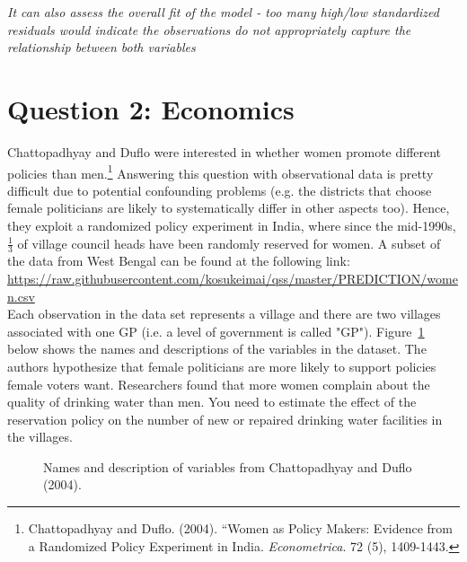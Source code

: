\documentclass[12pt,letterpaper]{article}
\begin{document}
\begin{enumerate}
	\vspace{.5cm}
	\textit{It can also assess the overall fit of the model - too many high/low standardized residuals would indicate the observations do not appropriately capture the relationship between both variables}
	
\end{enumerate}
\newpage

\section*{Question 2: Economics}
Chattopadhyay and Duflo were interested in whether women promote different policies than men.\footnote{Chattopadhyay and Duflo. (2004). ``Women as Policy Makers: Evidence from a Randomized Policy Experiment in India. \textit{Econometrica}. 72 (5), 1409-1443.} Answering this question with observational data is pretty difficult due to potential confounding problems (e.g. the districts that choose female politicians are likely to systematically differ in other aspects too). Hence, they exploit a randomized policy experiment in India, where since the mid-1990s, $\frac{1}{3}$ of village council heads have been randomly reserved for women. A subset of the data from West Bengal can be found at the following link: \url{https://raw.githubusercontent.com/kosukeimai/qss/master/PREDICTION/women.csv}\\

\noindent Each observation in the data set represents a village and there are two villages associated with one GP (i.e. a level of government is called "GP"). Figure~\ref{fig:women_desc} below shows the names and descriptions of the variables in the dataset. The authors hypothesize that female politicians are more likely to support policies female voters want. Researchers found that more women complain about the quality of drinking water than men. You need to estimate the effect of the reservation policy on the number of new or repaired drinking water facilities in the villages.
\vspace{.5cm}
\begin{figure}[h!]
	\caption{\footnotesize{Names and description of variables from Chattopadhyay and Duflo (2004).}}
	\vspace{.5cm}
	\centering
	\label{fig:women_desc}
\end{figure}		
\end{document}
